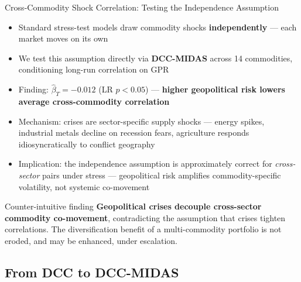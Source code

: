 ﻿\documentclass[aspectratio=1610]{beamer}
\begin{document}
\begin{frame}[shrink=10]{Cross-Commodity Shock Correlation: Testing the Independence Assumption}

  \begin{itemize}
    \item Standard stress-test models draw commodity shocks \textbf{independently}
          --- each market moves on its own
    \item We test this assumption directly via \textbf{DCC-MIDAS} across
          14 commodities, conditioning long-run correlation on GPR
    \item Finding: $\hat{\beta}_T = -0.012$ (LR $p < 0.05$) ---
          \textbf{higher geopolitical risk lowers average cross-commodity correlation}
    \item Mechanism: crises are sector-specific supply shocks --- energy spikes,
          industrial metals decline on recession fears, agriculture responds
          idiosyncratically to conflict geography
    \item Implication: the independence assumption is approximately correct for
          \emph{cross-sector} pairs under stress --- geopolitical risk amplifies
          commodity-specific volatility, not systemic co-movement
  \end{itemize}

  \begin{alertblock}{Counter-intuitive finding}
    \textbf{Geopolitical crises decouple cross-sector commodity co-movement},
    contradicting the assumption that crises tighten correlations.
    The diversification benefit of a multi-commodity portfolio is not eroded,
    and may be enhanced, under escalation.
  \end{alertblock}

\end{frame}

\subsection{From DCC to DCC-MIDAS}
\end{document}
